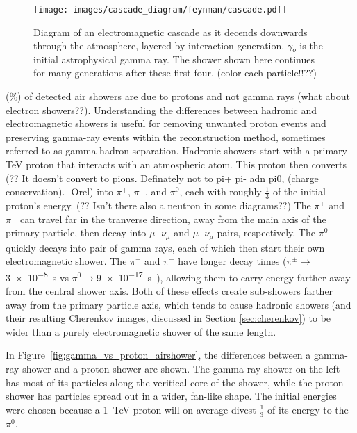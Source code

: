   \begin{figure}[ht]
    \centering
    \texttt{[image: images/cascade\_diagram/feynman/cascade.pdf]}
    \caption[Electromagnetic Cascade]{
      Diagram of an electromagnetic cascade as it decends downwards through the atmosphere, layered by interaction generation.
      $\gamma{}_o$ is the initial astrophysical gamma ray.
      The shower shown here continues for many generations after these first four.
      {\color{red}(color each particle!!??)}
    }
    \label{fig:emcascade}
  \end{figure}

  (\%) of detected air showers are due to {\color{red}protons and not gamma rays (what about electron showers??)}.
  Understanding the differences between hadronic and electromagnetic showers is useful for removing unwanted proton events and preserving gamma-ray events within the reconstruction method, sometimes referred to as gamma-hadron separation.
  Hadronic showers start with a primary \nicetilde TeV proton that interacts with an atmospheric atom.
  {\color{red}This proton then converts (?? It doesn't convert to pions. Definately not to pi+ pi- adn pi0, (charge conservation). -Orel)} into $\pi^{+}$, $\pi^{-}$, and $\pi^{0}$, each with roughly \nicetilde $\frac{1}{3}$ of the initial proton's energy.
  {\color{red}(?? Isn't there also a neutron in some diagrams??)}
  The $\pi^{+}$ and $\pi^{-}$ can travel far in the tranverse direction, away from the main axis of the primary particle, then decay into $\mu^{+}\nu_{\mu}$ and $\mu^{-}\bar{\nu}_{\mu}$ pairs, respectively.
  The $\pi^{0}$ quickly decays into pair of gamma rays, each of which then start their own electromagnetic shower.
  The $\pi^{+}$ and $\pi^{-}$ have longer decay times ($\pi^{\pm} \rightarrow $\SI{3e-8}{s} vs $\pi^{0} \rightarrow $\SI{9e-17}{s}~\cite{pdg_2014}), allowing them to carry energy farther away from the central shower axis.
  Both of these effects create sub-showers farther away from the primary particle axis, which tends to cause hadronic showers (and their resulting Cherenkov images, discussed in Section \ref{sec:cherenkov}) to be wider than a purely electromagnetic shower of the same length. 
  
  In Figure~\ref{fig:gamma_vs_proton_airshower}, the differences between a gamma-ray shower and a proton shower are shown.
  The gamma-ray shower on the left has most of its particles along the veritical core of the shower, while the proton shower has particles spread out in a wider, fan-like shape.
  The initial energies were chosen because a \SI{1}{TeV} proton will on average divest $\frac{1}{3}$ of its energy to the $\pi^{0}$.

